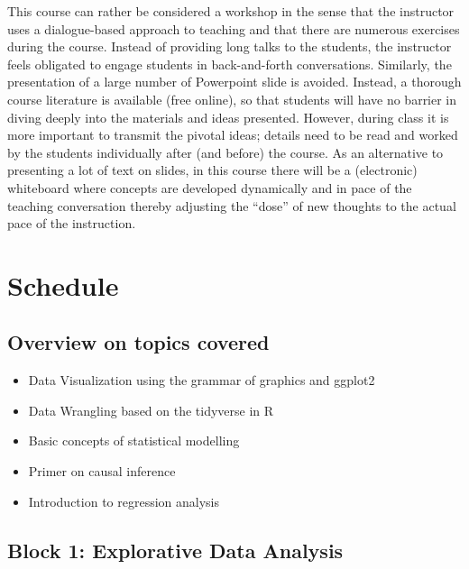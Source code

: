 \documentclass[
  letterpaper,
  DIV=11,
  numbers=noendperiod]{scrreprt}
\providecommand{\tightlist}{%
  \setlength{\itemsep}{0pt}\setlength{\parskip}{0pt}}\usepackage{longtable,booktabs,array}
\theoremstyle{definition}
\theoremstyle{definition}
\theoremstyle{remark}
\begin{document}
This course can rather be considered a workshop in the sense that the
instructor uses a dialogue-based approach to teaching and that there are
numerous exercises during the course. Instead of providing long talks to
the students, the instructor feels obligated to engage students in
back-and-forth conversations. Similarly, the presentation of a large
number of Powerpoint slide is avoided. Instead, a thorough course
literature is available (free online), so that students will have no
barrier in diving deeply into the materials and ideas presented.
However, during class it is more important to transmit the pivotal
ideas; details need to be read and worked by the students individually
after (and before) the course. As an alternative to presenting a lot of
text on slides, in this course there will be a (electronic) whiteboard
where concepts are developed dynamically and in pace of the teaching
conversation thereby adjusting the ``dose'' of new thoughts to the
actual pace of the instruction.

\hypertarget{schedule}{%
\section*{Schedule}\label{schedule}}

\hypertarget{overview-on-topics-covered}{%
\subsection*{Overview on topics
covered}\label{overview-on-topics-covered}}

\begin{itemize}
\tightlist
\item
  Data Visualization using the grammar of graphics and ggplot2
\item
  Data Wrangling based on the tidyverse in R
\item
  Basic concepts of statistical modelling
\item
  Primer on causal inference
\item
  Introduction to regression analysis
\end{itemize}

\hypertarget{block-1-explorative-data-analysis}{%
\subsection*{Block 1: Explorative Data
Analysis}\label{block-1-explorative-data-analysis}}
\end{document}

